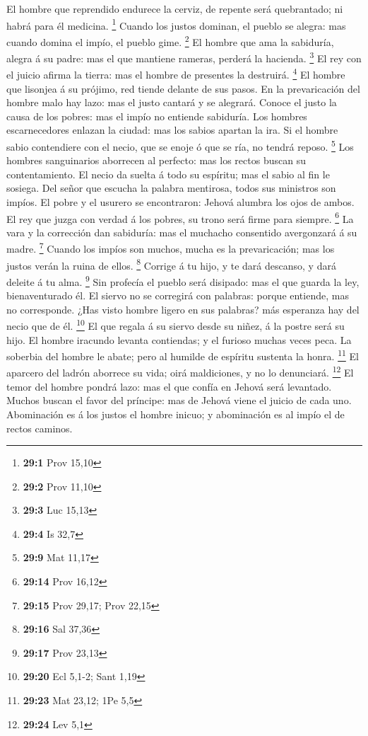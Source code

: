  El hombre que reprendido endurece la cerviz, de repente
será quebrantado; ni habrá para él medicina. \footnote{\textbf{29:1}
  Prov 15,10}  Cuando los justos dominan, el pueblo se
alegra: mas cuando domina el impío, el pueblo gime. \footnote{\textbf{29:2}
  Prov 11,10}  El hombre que ama la sabiduría, alegra á su
padre: mas el que mantiene rameras, perderá la hacienda. \footnote{\textbf{29:3}
  Luc 15,13}  El rey con el juicio afirma la tierra: mas el
hombre de presentes la destruirá. \footnote{\textbf{29:4} Is 32,7}
 El hombre que lisonjea á su prójimo, red tiende delante de
sus pasos.  En la prevaricación del hombre malo hay lazo:
mas el justo cantará y se alegrará.  Conoce el justo la
causa de los pobres: mas el impío no entiende sabiduría. 
Los hombres escarnecedores enlazan la ciudad: mas los sabios apartan la
ira.  Si el hombre sabio contendiere con el necio, que se
enoje ó que se ría, no tendrá reposo. \footnote{\textbf{29:9} Mat 11,17}
 Los hombres sanguinarios aborrecen al perfecto: mas los
rectos buscan su contentamiento.  El necio da suelta á todo
su espíritu; mas el sabio al fin le sosiega.  Del señor que
escucha la palabra mentirosa, todos sus ministros son impíos.
 El pobre y el usurero se encontraron: Jehová alumbra los
ojos de ambos.  El rey que juzga con verdad á los pobres,
su trono será firme para siempre. \footnote{\textbf{29:14} Prov 16,12}
 La vara y la corrección dan sabiduría: mas el muchacho
consentido avergonzará á su madre. \footnote{\textbf{29:15} Prov 29,17;
  Prov 22,15}  Cuando los impíos son muchos, mucha es la
prevaricación; mas los justos verán la ruina de ellos. \footnote{\textbf{29:16}
  Sal 37,36}  Corrige á tu hijo, y te dará descanso, y dará
deleite á tu alma. \footnote{\textbf{29:17} Prov 23,13} 
Sin profecía el pueblo será disipado: mas el que guarda la ley,
bienaventurado él.  El siervo no se corregirá con palabras:
porque entiende, mas no corresponde.  ¿Has visto hombre
ligero en sus palabras? más esperanza hay del necio que de él.
\footnote{\textbf{29:20} Ecl 5,1-2; Sant 1,19}  El que
regala á su siervo desde su niñez, á la postre será su hijo.
 El hombre iracundo levanta contiendas; y el furioso muchas
veces peca.  La soberbia del hombre le abate; pero al
humilde de espíritu sustenta la honra. \footnote{\textbf{29:23} Mat
  23,12; 1Pe 5,5}  El aparcero del ladrón aborrece su vida;
oirá maldiciones, y no lo denunciará. \footnote{\textbf{29:24} Lev 5,1}
 El temor del hombre pondrá lazo: mas el que confía en
Jehová será levantado.  Muchos buscan el favor del
príncipe: mas de Jehová viene el juicio de cada uno. 
Abominación es á los justos el hombre inicuo; y abominación es al impío
el de rectos caminos.

